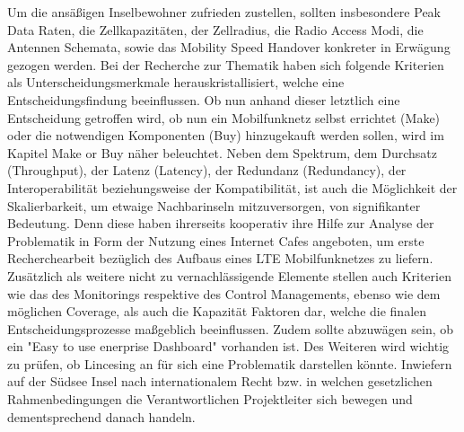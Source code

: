 Um die ansäßigen Inselbewohner zufrieden zustellen, sollten insbesondere Peak Data Raten, die Zellkapazitäten, der Zellradius, die Radio Access Modi, die Antennen Schemata, sowie das Mobility Speed Handover konkreter in Erwägung gezogen werden\cite{Dat14}.
Bei der Recherche zur Thematik haben sich folgende Kriterien als Unterscheidungsmerkmale herauskristallisiert, welche eine Entscheidungsfindung beeinflussen. Ob nun anhand dieser letztlich eine Entscheidung getroffen wird, ob nun ein Mobilfunknetz selbst errichtet (Make) oder die notwendigen Komponenten (Buy) hinzugekauft werden sollen, wird im Kapitel Make or Buy näher beleuchtet. Neben dem Spektrum, dem Durchsatz (Throughput), der Latenz (Latency), der Redundanz (Redundancy), der Interoperabilität beziehungsweise der Kompatibilität, ist auch die Möglichkeit der Skalierbarkeit, um etwaige Nachbarinseln mitzuversorgen, von signifikanter Bedeutung. Denn diese haben ihrerseits kooperativ ihre Hilfe zur Analyse der Problematik in Form der Nutzung eines Internet Cafes angeboten, um erste Recherchearbeit bezüglich des Aufbaus eines LTE Mobilfunknetzes zu liefern. Zusätzlich  als weitere nicht zu vernachlässigende Elemente stellen auch Kriterien wie das des Monitorings respektive des Control Managements, ebenso wie dem möglichen Coverage, als auch die Kapazität Faktoren dar, welche die finalen Entscheidungsprozesse maßgeblich beeinflussen. Zudem sollte abzuwägen sein, ob ein "Easy to use enerprise Dashboard" vorhanden ist. Des Weiteren wird wichtig zu prüfen, ob Lincesing an für sich eine Problematik darstellen könnte. Inwiefern auf der Südsee Insel nach internationalem Recht bzw. in welchen gesetzlichen Rahmenbedingungen die Verantwortlichen Projektleiter sich bewegen und dementsprechend danach handeln.
